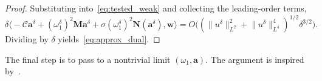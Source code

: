 \documentclass[a4paper,reqno,twoside]{amsart}
\numberwithin{equation}{section}
\theoremstyle{definition}
\newcommand{\<}{\ensuremath \leq}
\renewcommand{\>}{\ensuremath \geq}
\begin{document}
\begin{proof}
    Substituting into~\eqref{eq:tested_weak} and collecting the
    leading-order terms,
    \begin{equation}
        \delta \bigl\langle
          -\mathcal{C} \mathbf{a}^\delta
          + (\omega_1^\delta)^2 \mathbf{M} \mathbf{a}^\delta
          + \sigma (\omega_1^\delta)^2
            \mathbf{N}(\mathbf{a}^\delta),
          \mathbf{w}
        \bigr\rangle
        = O\bigl(
          (\lVert u^\delta \rVert_{L^2}^2
            + \lVert u^\delta \rVert_{L^4}^4)^{1/2}
          \delta^{3/2}
        \bigr).
    \end{equation}
    Dividing by $\delta$ yields~\eqref{eq:approx_dual}.
\end{proof}


The final step is to pass to a nontrivial limit
$(\omega_1, \mathbf{a})$. The argument is inspired
by~\cite{pankov2010gap}.
\end{document}
